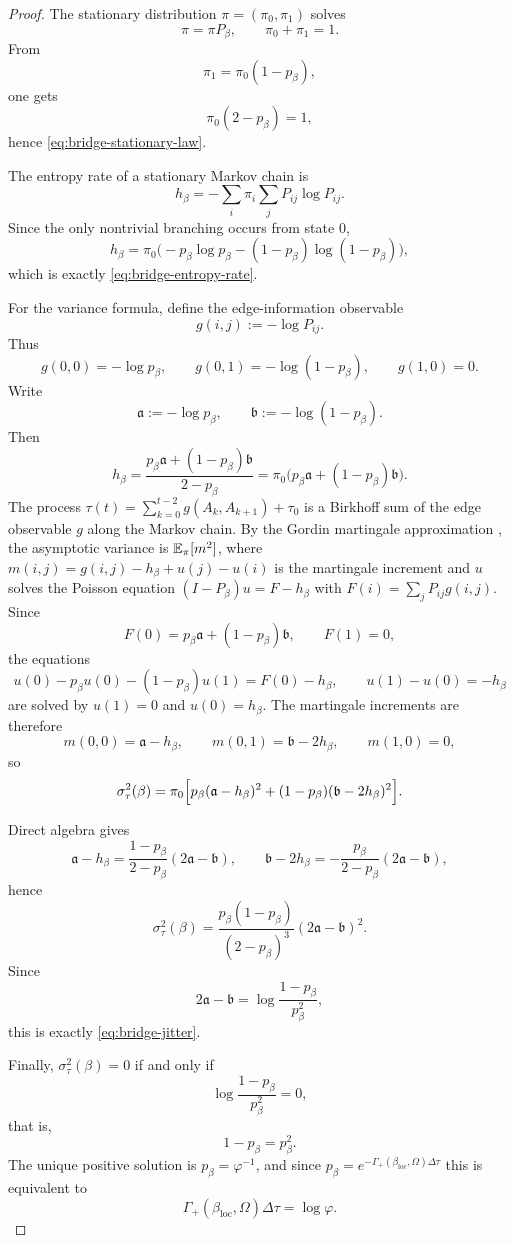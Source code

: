 \begin{proof}
The stationary distribution $\pi=(\pi_0,\pi_1)$ solves
\[
\pi=\pi P_\beta,
\qquad
\pi_0+\pi_1=1.
\]
From
\[
\pi_1=\pi_0(1-p_\beta),
\]
one gets
\[
\pi_0(2-p_\beta)=1,
\]
hence \eqref{eq:bridge-stationary-law}.

The entropy rate of a stationary Markov chain is
\[
h_\beta
=
-\sum_i \pi_i\sum_j P_{ij}\log P_{ij}.
\]
Since the only nontrivial branching occurs from state $0$,
\[
h_\beta
=
\pi_0\bigl(-p_\beta\log p_\beta-(1-p_\beta)\log(1-p_\beta)\bigr),
\]
which is exactly \eqref{eq:bridge-entropy-rate}.

For the variance formula, define the edge-information observable
\[
g(i,j):=-\log P_{ij}.
\]
Thus
\[
g(0,0)=-\log p_\beta,\qquad
g(0,1)=-\log(1-p_\beta),\qquad
g(1,0)=0.
\]
Write
\[
\mathfrak a:=-\log p_\beta,
\qquad
\mathfrak b:=-\log(1-p_\beta).
\]
Then
\[
h_\beta=\frac{p_\beta \mathfrak a+(1-p_\beta)\mathfrak b}{2-p_\beta}
=\pi_0\bigl(p_\beta \mathfrak a+(1-p_\beta)\mathfrak b\bigr).
\]
The process $\tau(t)=\sum_{k=0}^{t-2}g(A_k,A_{k+1})+\tau_0$ is a Birkhoff sum of the edge observable $g$ along the Markov chain. By the Gordin martingale approximation \cite{Gordin1969}, the asymptotic variance is $\mathbb{E}_\pi[m^2]$, where $m(i,j)=g(i,j)-h_\beta+u(j)-u(i)$ is the martingale increment and $u$ solves the Poisson equation $(I-P_\beta)u=F-h_\beta$ with $F(i)=\sum_j P_{ij}g(i,j)$. Since
\[
F(0)=p_\beta\mathfrak a+(1-p_\beta)\mathfrak b,
\qquad
F(1)=0,
\]
the equations
\[
u(0)-p_\beta u(0)-(1-p_\beta)u(1)=F(0)-h_\beta,
\qquad
u(1)-u(0)=-h_\beta
\]
are solved by $u(1)=0$ and $u(0)=h_\beta$. The martingale increments are therefore
\[
m(0,0)=\mathfrak a-h_\beta,
\qquad
m(0,1)=\mathfrak b-2h_\beta,
\qquad
m(1,0)=0,
\]
so
\[
\sigma_\tau^2(\beta)
=
\pi_0\Bigl[
p_\beta(\mathfrak a-h_\beta)^2
+
(1-p_\beta)(\mathfrak b-2h_\beta)^2
\Bigr].
\]

Direct algebra gives
\[
\mathfrak a-h_\beta
=
\frac{1-p_\beta}{2-p_\beta}(2\mathfrak a-\mathfrak b),
\qquad
\mathfrak b-2h_\beta
=
-\frac{p_\beta}{2-p_\beta}(2\mathfrak a-\mathfrak b),
\]
hence
\[
\sigma_\tau^2(\beta)
=
\frac{p_\beta(1-p_\beta)}{(2-p_\beta)^3}(2\mathfrak a-\mathfrak b)^2.
\]
Since
\[
2\mathfrak a-\mathfrak b
=
\log\frac{1-p_\beta}{p_\beta^2},
\]
this is exactly \eqref{eq:bridge-jitter}.

Finally, $\sigma_\tau^2(\beta)=0$ if and only if
\[
\log\frac{1-p_\beta}{p_\beta^2}=0,
\]
that is,
\[
1-p_\beta=p_\beta^2.
\]
The unique positive solution is $p_\beta=\varphi^{-1}$, and since $p_\beta=e^{-\Gamma_+(\beta_{\mathrm{loc}},\Omega)\Delta\tau}$ this is equivalent to
\[
\Gamma_+(\beta_{\mathrm{loc}},\Omega)\Delta\tau=\log\varphi.
\]
\end{proof}

